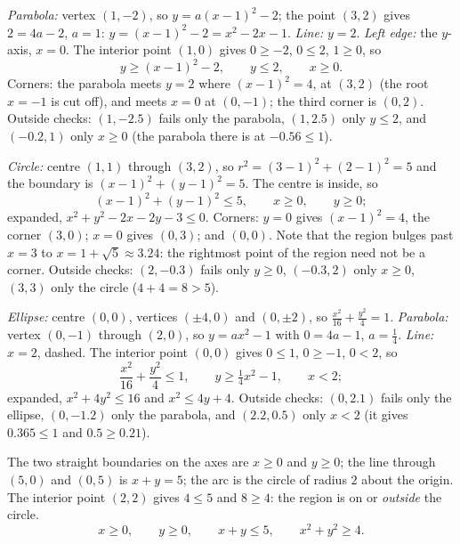 \begin{solutions}[resume]
  \item \emph{Parabola:} vertex $(1,-2)$, so $y=a(x-1)^{2}-2$; the point
        $(3,2)$ gives $2=4a-2$, $a=1$: $y=(x-1)^{2}-2=x^{2}-2x-1$.
        \emph{Line:} $y=2$. \emph{Left edge:} the $y$-axis, $x=0$. The
        interior point $(1,0)$ gives $0\ge-2$, $0\le2$, $1\ge0$, so
        \[
          y\ge(x-1)^{2}-2,\qquad y\le2,\qquad x\ge0 .
        \]
        Corners: the parabola meets $y=2$ where $(x-1)^{2}=4$, at $(3,2)$
        (the root $x=-1$ is cut off), and meets $x=0$ at $(0,-1)$; the
        third corner is $(0,2)$. Outside checks: $(1,-2.5)$ fails only the
        parabola, $(1,2.5)$ only $y\le2$, and $(-0.2,1)$ only $x\ge0$
        (the parabola there is at $-0.56\le1$).
  \item \emph{Circle:} centre $(1,1)$ through $(3,2)$, so
        $r^{2}=(3-1)^{2}+(2-1)^{2}=5$ and the boundary is
        $(x-1)^{2}+(y-1)^{2}=5$. The centre is inside, so
        \[
          (x-1)^{2}+(y-1)^{2}\le5,\qquad x\ge0,\qquad y\ge0 ;
        \]
        expanded, $x^{2}+y^{2}-2x-2y-3\le0$. Corners: $y=0$ gives
        $(x-1)^{2}=4$, the corner $(3,0)$; $x=0$ gives $(0,3)$; and
        $(0,0)$. Note that the region bulges past $x=3$ to
        $x=1+\sqrt5\approx3.24$: the rightmost point of the region need
        not be a corner.
        Outside checks: $(2,-0.3)$ fails only $y\ge0$, $(-0.3,2)$ only
        $x\ge0$, $(3,3)$ only the circle ($4+4=8>5$).
  \item \emph{Ellipse:} centre $(0,0)$, vertices $(\pm4,0)$ and $(0,\pm2)$,
        so $\tfrac{x^{2}}{16}+\tfrac{y^{2}}{4}=1$. \emph{Parabola:} vertex
        $(0,-1)$ through $(2,0)$, so $y=ax^{2}-1$ with $0=4a-1$,
        $a=\tfrac14$. \emph{Line:} $x=2$, dashed. The interior point
        $(0,0)$ gives $0\le1$, $0\ge-1$, $0<2$, so
        \[
          \frac{x^{2}}{16}+\frac{y^{2}}{4}\le1,\qquad
          y\ge\tfrac14x^{2}-1,\qquad x<2 ;
        \]
        expanded, $x^{2}+4y^{2}\le16$ and $x^{2}\le4y+4$. Outside checks:
        $(0,2.1)$ fails only the ellipse, $(0,-1.2)$ only the parabola,
        and $(2.2,0.5)$ only $x<2$ (it gives $0.365\le1$ and
        $0.5\ge0.21$).
  \item The two straight boundaries on the axes are $x\ge0$ and $y\ge0$;
        the line through $(5,0)$ and $(0,5)$ is $x+y=5$; the arc is the
        circle of radius $2$ about the origin. The interior point $(2,2)$
        gives $4\le5$ and $8\ge4$: the region is on or \emph{outside} the
        circle.
        \[
          x\ge0,\qquad y\ge0,\qquad x+y\le5,\qquad x^{2}+y^{2}\ge4 .
\]
\end{solutions}
